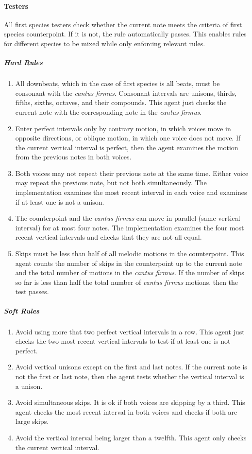 \paragraph{Testers}
All first species testers check whether the current note meets the criteria of first species counterpoint. If it is not, the rule automatically passes.
This enables rules for different species to be mixed while only enforcing relevant rules.
\subparagraph{Hard Rules}
	\begin{enumerate}
		\item All downbeats, which in the case of first species is all beats, must be consonant with the \emph{cantus firmus}. 
					Consonant intervals are unisons, thirds, fifths, sixths, octaves, and their compounds.
					This agent just checks the current note with the corresponding note in the \emph{cantus firmus}.

		\item Enter perfect intervals only by contrary motion, in which voices move in opposite directions, or oblique motion, in which one voice does not move.
					If the current vertical interval is perfect, then the agent examines the motion from the previous notes in both voices.

		\item Both voices may not repeat their previous note at the same time. Either voice may repeat the previous note, but not both simultaneously.
          The implementation examines the most recent interval in each voice and examines if at least one is not a unison.

		\item The counterpoint and the \emph{cantus firmus} can move in parallel (same vertical interval) for at most four notes.
          The implementation examines the four most recent vertical intervals and checks that they are not all equal.

		\item Skips must be less than half of all melodic motions in the counterpoint.
          This agent counts the number of skips in the counterpoint up to the current note and the total number of motions in the \emph{cantus firmus}.
          If the number of skips so far is less than half the total number of \emph{cantus firmus} motions, then the test passes.

	\end{enumerate}
\subparagraph{Soft Rules}
	\begin{enumerate}
		\item Avoid using more that two perfect vertical intervals in a row. This agent just checks the two most recent vertical intervals to test if at least one is not perfect.
		\item Avoid vertical unisons except on the first and last notes. If the current note is not the first or last note, then the agent tests whether the vertical interval is a unison.
		\item Avoid simultaneous skips. It is ok if both voices are skipping by a third. This agent checks the most recent interval in both voices and checks if both are large skips.
		\item Avoid the vertical interval being larger than a twelfth. This agent only checks the current vertical interval.
	\end{enumerate}

